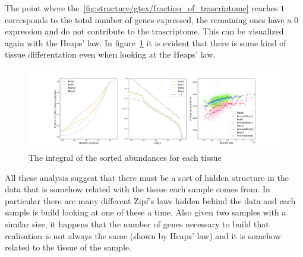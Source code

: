 The point where the~\ref{fig:structure/gtex/fraction_of_trascriptome} reaches $1$ corresponds to the total number of genes expressed, the remaining ones have a $0$ expression and do not contribute to the trascriptome. This can be visualized again with the Heaps' law. In figure~\ref{fig:structure/gtex/heaps_tissue} it is evident that there is some kind of tissue differentation even when looking at the Heaps' law.
\begin{figure}[htb!]
  \centering
  \includegraphics[width=0.6\linewidth]{pictures/structure/gtex/heaps_tissue.pdf}
  \caption{The integral of the sorted abundances for each tissue}
  \label{fig:structure/gtex/heaps_tissue}
\end{figure}

All these analysis suggest that there must be a sort of hidden structure in the data that is somehow related with the tissue each sample comes from. In particular there are many different Zipf's laws hidden behind the data and each sample is build looking at one of these a time. Also given two samples with a similar size, it happens that the number of genes necessary to build that realisation is not always the same (shown by Heaps' law) and it is somehow related to the tissue of the sample.
